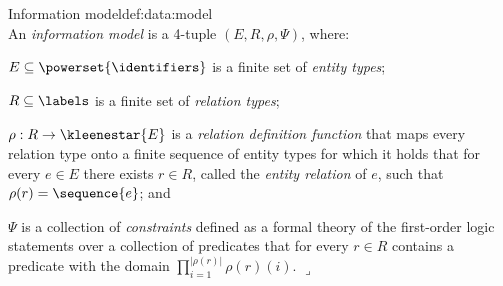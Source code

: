 %
%

\begin{ncdefine}{Information model}{def:data:model}{\quad\\}
An \emph{information model} is a 4-tuple $(E,R,\rho,\Psi)$, where:
\begin{compactitem}
\item
$E \subseteq \powerset{\identifiers}$ is a finite set of \emph{entity types};
\item
$R \subseteq \labels$ is a finite set of \emph{relation types};
\item
$\rho : R \rightarrow \kleenestar{E}$ is a \emph{relation definition function} that maps every relation type onto a finite sequence of entity types 
for which it holds that for every $e \in E$ there exists $r \in R$, called the \emph{entity relation} of $e$, such that $\rho(r)=\sequence{e}$; and
\item
$\Psi$ is a collection of \emph{constraints} defined as a formal theory of the first-order logic statements over 
a collection of predicates that for every $r \in R$ contains a predicate with the domain $\prod_{i=1}^{|\rho(r)|}{\rho(r)(i)}$. 
\hfill\ensuremath{\lrcorner}
\end{compactitem}	
\end{ncdefine}
